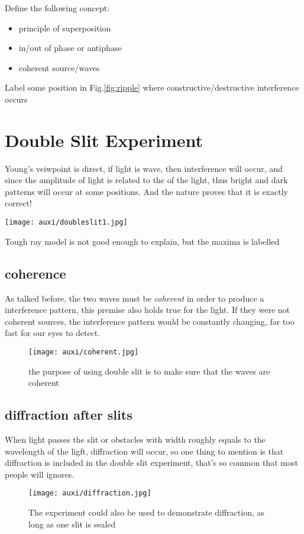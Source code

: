 \documentclass[a4paper]{tufte-handout}
\newenvironment{TaskBox} %
{\begin{tcolorbox}[breakable,colback=b1!30,colframe=b1,title=Task]} {\end{tcolorbox}}
\begin{document}
\begin{TaskBox}
Define the following concept:\\
\begin{itemize}
  \item principle of superposition
  \item in/out of phase or antiphase
  \item coherent source/waves
\end{itemize}
\tcblower
Label some position in Fig.\ref{fig:ripple} where constructive/destructive interference occurs 
\end{TaskBox}

\section{Double Slit Experiment}
Young's veiwpoint is direct, if light is wave, then interference will occur, and since the amplitude of light is related to the \uline{\hspace{1in}} of the light, thus bright and dark patterns will occur at some positions. And the nature proves that it is exactly correct!
\begin{marginfigure}
\texttt{[image: auxi/doubleslit1.jpg]}
\caption{Tough ray model is not good enough to explain, but the maxima is labelled}
\label{fig:ray-doubleslit}
\end{marginfigure}

\subsection{coherence}
As talked before, the two waves must be \emph{coherent} in order to produce a interference pattern, this premise also holds true for the light. If they were not coherent sources, the interference pattern would be constantly changing, far too fast for our eyes to detect.
\begin{figure}[h]
\centering
\texttt{[image: auxi/coherent.jpg]}
\caption{the purpose of using double slit is to make sure that the waves are coherent}
\label{fig:coherent}
\end{figure}

\subsection{diffraction after slits}
When light passes the slit or obstacles with width roughly equals to the wavelength of the ligft, diffraction will occur, so one thing to mention is that diffraction is included in the double slit experiment, that's so common that most people will ignores.
\begin{figure}[h]
\centering
\texttt{[image: auxi/diffraction.jpg]}
\caption{The experiment could also be used to demonstrate diffraction, as long as one slit is sealed}
\label{fig:diffraction in double slit}
\end{figure}
\end{document}
